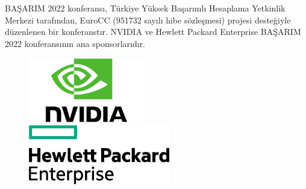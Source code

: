 \begin{center}
BAŞARIM 2022 konferansı, Türkiye Yüksek Başarımlı Hesaplama Yetkinlik Merkezi tarafından, EuroCC (951732 sayılı hibe sözleşmesi) projesi desteğiyle düzenlenen bir konferanstır. NVIDIA ve Hewlett Packard Enterprise BAŞARIM 2022 konferansının ana sponsorlarıdır. 
\end{center}

\begin{figure}[!h]
\includegraphics[width=0.45\textwidth]{Nvidia-logo.png}
\includegraphics[width=0.55\textwidth]{hpe_pri_grn_pos_rgb.png}
\end{figure}

\vfill
